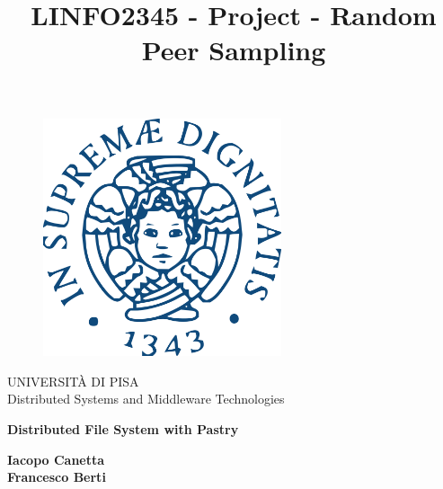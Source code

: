 \documentclass{article}
\title{LINFO2345 - Project - Random Peer Sampling}
\begin{document}
\begin{titlepage}

     \begin{figure}[H]
        \includegraphics[width=7cm, center]{images/Stemma_unipi.svg.png}
        \label{fig:number components}
    \end{figure}


\begin{center}
    \LARGE{UNIVERSITÀ DI PISA}
    \vspace{5mm}
    \\ \LARGE{Distributed Systems and Middleware Technologies}
\end{center}

\vspace{15mm}
\begin{center}
    {\LARGE{\bf Distributed File System with Pastry\\ \vspace{5mm}}}
    
    
\end{center}
\vspace{20mm}

\begin{center}
    {\LARGE{{\bf Iacopo Canetta\\ \vspace{5mm}}}}
    {\LARGE{{\bf Francesco Berti\\ \vspace{5mm}}}}
\end{center}

\vspace{18mm}
\hrulefill
\\

\end{titlepage}
\end{document}
